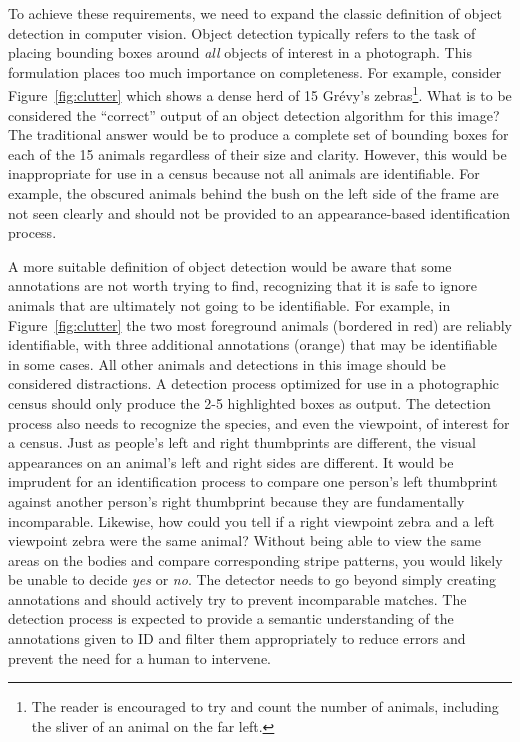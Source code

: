 \noindent To achieve these requirements, we need to expand the classic definition of object detection in computer vision.  Object detection typically refers to the task of placing bounding boxes around \textit{all} objects of interest in a photograph.  This formulation places too much importance on completeness.  For example, consider Figure~\ref{fig:clutter} which shows a dense herd of 15 Gr\'evy's zebras\footnote{The reader is encouraged to try and count the number of animals, including the sliver of an animal on the far left.}.  What is to be considered the ``correct'' output of an object detection algorithm for this image?  The traditional answer would be to produce a complete set of bounding boxes for each of the 15 animals regardless of their size and clarity.  However, this would be inappropriate for use in a census because not all animals are identifiable.  For example, the obscured animals behind the bush on the left side of the frame are not seen clearly and should not be provided to an appearance-based identification process.

A more suitable definition of object detection would be aware that some annotations are not worth trying to find, recognizing that it is safe to ignore animals that are ultimately not going to be identifiable. For example, in Figure~\ref{fig:clutter} the two most foreground animals (bordered in red) are reliably identifiable, with three additional annotations (orange) that may be identifiable in some cases.  All other animals and detections in this image should be considered distractions. A detection process optimized for use in a photographic census should only produce the 2-5 highlighted boxes as output.  The detection process also needs to recognize the species, and even the viewpoint, of interest for a census.  Just as people's left and right thumbprints are different, the visual appearances on an animal's left and right sides are different.  It would be imprudent for an identification process to compare one person's left thumbprint against another person's right thumbprint because they are fundamentally incomparable. Likewise, how could you tell if a right viewpoint zebra and a left viewpoint zebra were the same animal?  Without being able to view the same areas on the bodies and compare corresponding stripe patterns, you would likely be unable to decide \textit{yes} or \textit{no}.  The detector needs to go beyond simply creating annotations and should actively try to prevent incomparable matches.  The detection process is expected to provide a semantic understanding of the annotations given to ID and filter them appropriately to reduce errors and prevent the need for a human to intervene.

